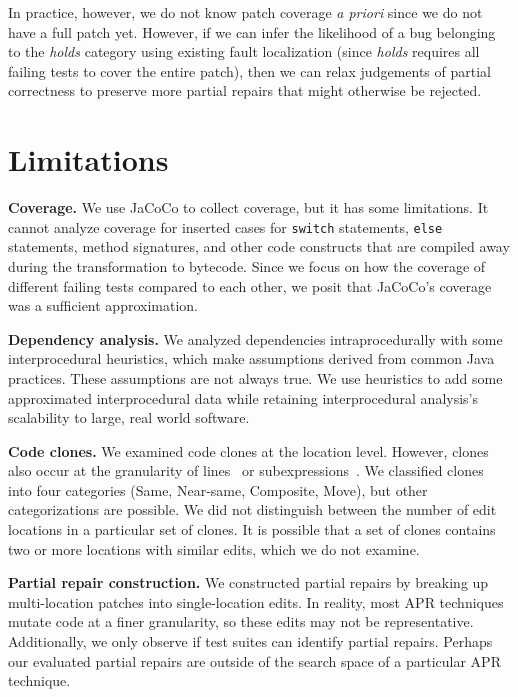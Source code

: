 \documentclass[10pt, conference]{IEEEtran}
\begin{document}
In practice, however, we do not know patch coverage \emph{a priori}  
since we do not have a full patch yet. However, if we can infer the
likelihood of a bug belonging to the \emph{holds} category using existing 
fault localization (since \emph{holds} requires all failing tests to cover the 
entire patch), then we can relax judgements of partial correctness to 
preserve more partial repairs that might otherwise be rejected.

\section{Limitations}
\label{sec:limits}

\noindent\textbf{Coverage.}
We use JaCoCo to collect coverage, but it has some
limitations. It cannot analyze coverage for inserted
cases for \texttt{switch} statements, \texttt{else} statements, method
signatures, and other code constructs that are compiled away during the
transformation to bytecode. Since we focus on how the coverage of different
failing tests compared to each other, we posit that JaCoCo's coverage was a
sufficient approximation.

\vspace{1ex}
\noindent\textbf{Dependency analysis.}
We analyzed dependencies intraprocedurally with some interprocedural 
heuristics, which make assumptions derived from common Java practices.
These assumptions are not always true. We use heuristics to add some
approximated interprocedural data while retaining interprocedural 
analysis's scalability to large, real world software.

\vspace{1ex}
\noindent\textbf{Code clones.}
We examined code clones at the location level.  However, clones also occur at the
granularity of lines~\cite{JiaClones} or
subexpressions~\cite{microclones}. We classified clones into four
categories (Same, Near-same, Composite, Move), but other categorizations 
are possible.
%
We did not distinguish between the number
of edit locations in a particular set of clones. It is possible that a set of
clones contains two or more locations with similar edits, which we do not examine. 

\vspace{1ex}
\noindent\textbf{Partial repair construction.}
We constructed partial repairs by breaking up multi-location patches
into single-location edits.
In reality, most APR techniques mutate code at a finer granularity, so
these edits may not be representative.  Additionally, we only observe if test suites
can identify partial repairs. Perhaps our evaluated partial repairs
are outside of the search space of a
particular APR technique.
\end{document}
